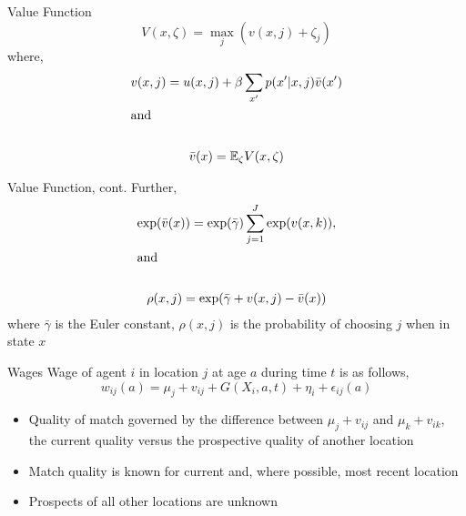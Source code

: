 \documentclass[aspectratio=169,professionalfonts]{beamer}
\begin{document}
\begin{frame}{Value Function}
  \begin{equation}
    V(x, \zeta) = \max_j(v(x,j) + \zeta_j)
  \end{equation}
  where,
  \begin{gather*}
    v(x,j) = u(x,j) + \beta\sum_{x'}p(x'|x,j)\bar{v}(x') \\
    \shortintertext{and} \\
    \bar{v}(x) = \mathbb{E}_{\zeta}V(x,\zeta)
  \end{gather*}
\end{frame}

\begin{frame}{Value Function, cont.}
  Further,
  \begin{gather*}
    \exp(\bar{v}(x)) = \exp(\bar{\gamma})\sum\limits_{j=1}^J\exp(v(x,k)), \\
    \shortintertext{and} \\
    \rho(x,j) = \exp(\bar{\gamma}+v(x,j)-\bar{v}(x))
  \end{gather*}
  where $\bar{\gamma}$ is the Euler constant, $\rho(x,j)$ is the probability of choosing $j$ when in state $x$
\end{frame}

\begin{frame}{Wages}
  Wage of agent $i$ in location $j$ at age $a$ during time $t$ is as follows,
  \begin{equation}
    w_{ij}(a) = \mu_j + v_{ij} + G(X_i, a, t) + \eta_i + \epsilon_{ij}(a)
  \end{equation}
  \begin{itemize}
  \item Quality of match governed by the difference between $\mu_j + v_{ij}$ and $\mu_k + v_{ik}$, the current quality versus the prospective quality of another location
  \item Match quality is known for current and, where possible, most recent location
  \item Prospects of all other locations are unknown
  \end{itemize}
\end{frame}
\end{document}
